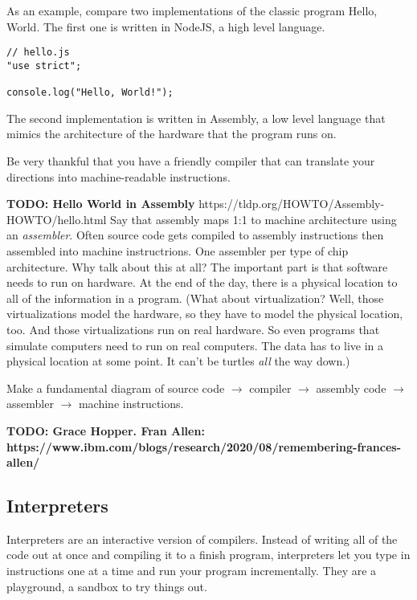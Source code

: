 As an example, compare two implementations of the classic program \textsf{Hello, World}. The first one is written in NodeJS, a high level language.

\begin{lstlisting}[caption={\label{listing:intro-hello-world-nodejs} Hello, World! in NodeJS.}, escapeinside=$$, firstnumber=1]
// hello.js
"use strict";

console.log("Hello, World!");
\end{lstlisting}

The second implementation is written in Assembly, a low level language that mimics the architecture of the hardware that the program runs on.

Be very thankful that you have a friendly compiler that can translate your directions into machine-readable instructions.

\textbf{TODO: Hello World in Assembly} https://tldp.org/HOWTO/Assembly-HOWTO/hello.html Say that assembly maps 1:1 to machine architecture using an \emph{assembler}. Often source code gets compiled to assembly instructions then assembled into machine instructrions. One assembler per type of chip architecture. Why talk about this at all? The important part is that software needs to run on hardware. At the end of the day, there is a physical location to all of the information in a program. (What about virtualization? Well, those virtualizations model the hardware, so they have to model the physical location, too. And those virtualizations run on real hardware. So even programs that simulate computers need to run on real computers. The data has to live in a physical location at some point. It can't be turtles \emph{all} the way down.)

Make a fundamental diagram of source code $\to$ compiler $\to$ assembly code $\to$ assembler $\to$ machine instructions.

\textbf{TODO: Grace Hopper.
Fran Allen: https://www.ibm.com/blogs/research/2020/08/remembering-frances-allen/}

\subsection{Interpreters}

Interpreters are an interactive version of compilers. Instead of writing all of the code out at once and compiling it to a finish program, interpreters let you type in instructions one at a time and run your program incrementally. They are a playground, a sandbox to try things out.

